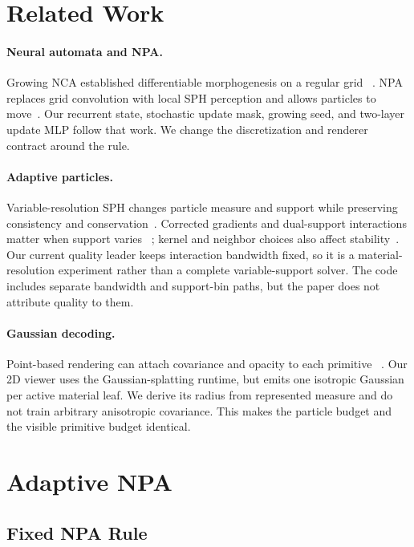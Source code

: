 \documentclass[sigconf,nonacm]{acmart}
\begin{document}
\section{Related Work}

\paragraph{Neural automata and NPA.}
Growing NCA established differentiable morphogenesis on a regular grid
~\cite{mordvintsev2020growing}. NPA replaces grid convolution with local SPH
perception and allows particles to move~\cite{kim2026npa}. Our recurrent state,
stochastic update mask, growing seed, and two-layer update MLP follow that
work. We change the discretization and renderer contract around the rule.

\paragraph{Adaptive particles.}
Variable-resolution SPH changes particle measure and support while preserving
consistency and conservation~\cite{price2012sph,muta2022efficient}. Corrected
gradients and dual-support interactions matter when support varies
~\cite{bonet1999variational,ren2016dual}; kernel and neighbor choices also
affect stability~\cite{dehnen2012improving}. Our current quality leader keeps
interaction bandwidth fixed, so it is a material-resolution experiment rather
than a complete variable-support solver. The code includes separate bandwidth
and support-bin paths, but the paper does not attribute quality to them.

\paragraph{Gaussian decoding.}
Point-based rendering can attach covariance and opacity to each primitive
~\cite{kerbl2023gaussian}. Our 2D viewer uses the Gaussian-splatting runtime,
but emits one isotropic Gaussian per active material leaf. We derive its radius
from represented measure and do not train arbitrary anisotropic covariance.
This makes the particle budget and the visible primitive budget identical.

\section{Adaptive NPA}

\subsection{Fixed NPA Rule}
\end{document}
